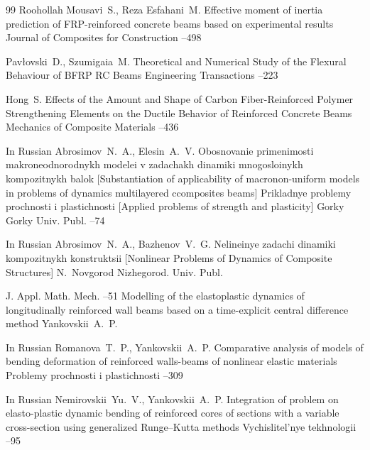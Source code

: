 \begin{thebibliography}{99}
\by Roohollah Mousavi~S., Reza Esfahani~M.
\paper Effective moment of inertia prediction of FRP-reinforced concrete beams based on experimental results
\jour Journal of Composites for Construction
--498


\by Pav{\l}ovski~D., Szumigaia~M.
\paper Theoretical and Numerical Study of the Flexural Behaviour of BFRP RC Beams
\jour Engineering Transactions
--223

\by Hong~S.
\paper Effects of the Amount and Shape of Carbon Fiber-Reinforced Polymer Strengthening Elements on the Ductile Behavior of Reinforced Concrete Beams
\jour Mechanics of Composite Materials
--436

\lang In Russian
\by Abrosimov~N.~A., Elesin~A.~V.
\paper Obosnovanie primenimosti makroneodnorodnykh modelei v zadachakh dinamiki mnogosloinykh kompozitnykh balok \rm [Substantiation of applicability of macronon-uniform models in problems of dynamics multilayered ccomposites beams]
\inbook Prikladnye problemy prochnosti i plastichnosti \rm [Applied problems of strength and plasticity]
\publaddr Gorky
\publ Gorky Univ. Publ.
--74


\lang In Russian
\by Abrosimov~N.~A., Bazhenov~V.~G.
\book Nelineinye zadachi dinamiki kompozitnykh konstruktsii \rm [Nonlinear Problems of Dynamics of Composite Structures]
\publaddr N.~Novgorod
\publ Nizhegorod. Univ. Publ.


\jour J. Appl. Math. Mech.
--51
\paper Modelling of the elastoplastic dynamics of longitudinally reinforced wall beams based on a time-explicit central difference method
\by Yankovskii~A.~P.

\lang In Russian
\by Romanova~T.~P., Yankovskii~A.~P.
\paper Comparative analysis of models of bending deformation of reinforced walls-beams of nonlinear elastic materials
\jour Problemy prochnosti i plastichnosti
--309



\lang In Russian
\by Nemirovskii~Yu.~V., Yankovskii~A.~P.
\paper  Integration of problem on elasto-plastic dynamic bending of reinforced cores of sections with a variable cross-section using generalized Runge--Kutta methods
\jour Vychislitel'nye tekhnologii
--95



\end{thebibliography}
